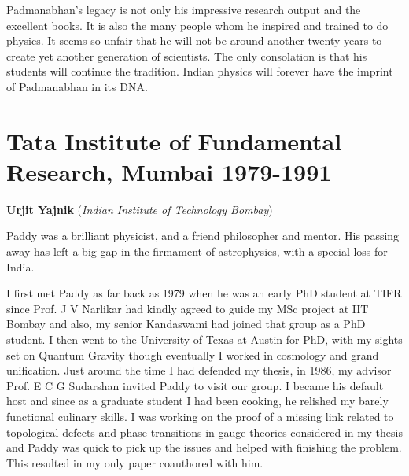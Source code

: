 \documentclass[prd, preprint, longbibliography, 12pt]{revtex4-2}
\begin{document}
Padmanabhan's legacy is not only his impressive research output and the excellent books. It is also the many people whom he inspired and trained to do physics. It seems so unfair that he will not be around another twenty years to create yet another generation of scientists. The only consolation is that  his students will continue the tradition. Indian physics will forever have the imprint of Padmanabhan in its DNA.



\section{Tata Institute of Fundamental Research, Mumbai 1979-1991}
\smallskip
\centerline{{\bf Urjit Yajnik} ({\it Indian Institute of Technology Bombay})}
\medskip
{}

\noindent Paddy was a brilliant physicist, and a friend philosopher and mentor. His passing away has left a big gap in the firmament of astrophysics, with a special loss for India. 

I first met Paddy as far back as 1979 when he was an early PhD student at TIFR since Prof. J V Narlikar had kindly agreed to guide my MSc project at IIT Bombay and also, my senior Kandaswami had joined that group as a PhD student. I then went to the University of Texas at Austin for PhD, with my sights set on Quantum Gravity though eventually I worked in cosmology and grand unification. Just around the time I had defended my thesis, in 1986, my advisor Prof. E C G Sudarshan invited Paddy to visit our group. I became his default host and since as a graduate student I had been cooking, he relished my barely functional culinary skills. I was working on the proof of a missing link related to topological defects and phase transitions in gauge theories considered in my thesis and Paddy was quick to pick up the issues and helped with finishing the problem. This resulted in my only paper coauthored with him. 
\end{document}
